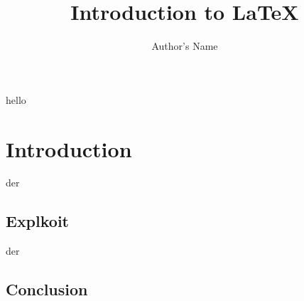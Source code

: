 \documentclass{article}
\begin{document}
\title{Introduction to \LaTeX{}}
\author{Author's Name}
\maketitle
hello


\section{Introduction}
der
\subsection{Explkoit}
der
\subsection{Conclusion}
\end{document}
